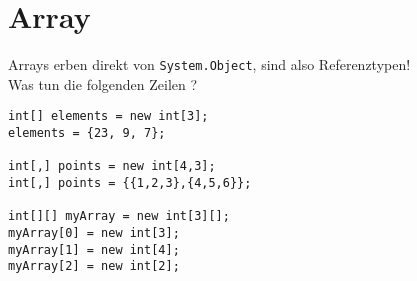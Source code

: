 \section{Array}

Arrays erben direkt von \lstinline$System.Object$, sind also Referenztypen!\\
Was tun die folgenden Zeilen ? 
\begin{lstlisting}[language={[Sharp]C}]
int[] elements = new int[3];
elements = {23, 9, 7};

int[,] points = new int[4,3];
int[,] points = {{1,2,3},{4,5,6}};

int[][] myArray = new int[3][];
myArray[0] = new int[3];
myArray[1] = new int[4];
myArray[2] = new int[2];
\end{lstlisting}